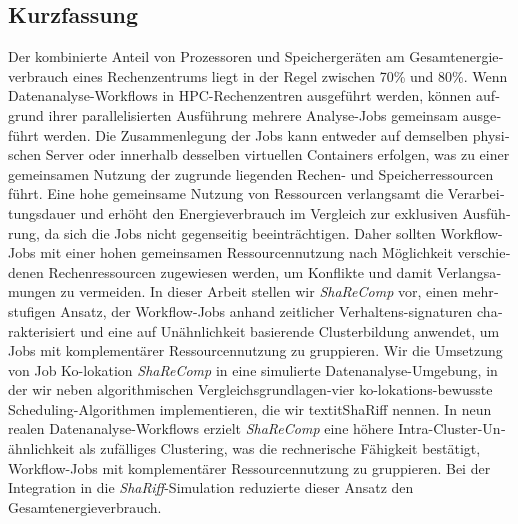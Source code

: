 \documentclass[a4paper, 11pt]{article}
\begin{document}
\clearpage
\begin{otherlanguage}{ngerman}
    \section*{Kurzfassung}
    Der kombinierte Anteil von Prozessoren und Speichergeräten am Gesamtenergieverbrauch eines Rechenzentrums liegt in der Regel zwischen 70\% und 80\%. Wenn Datenanalyse-Workflows in HPC-Rechenzentren ausgeführt werden, können aufgrund ihrer parallelisierten Ausführung mehrere Analyse-Jobs gemeinsam ausgeführt werden. Die Zusammenlegung der Jobs kann entweder auf demselben physischen Server oder innerhalb desselben virtuellen Containers erfolgen, was zu einer gemeinsamen Nutzung der zugrunde liegenden Rechen- und Speicherressourcen führt. Eine hohe gemeinsame Nutzung von Ressourcen verlangsamt die Verarbeitungsdauer und erhöht den Energieverbrauch im Vergleich zur exklusiven Ausführung, da sich die Jobs nicht gegenseitig beeinträchtigen. Daher sollten Workflow-Jobs mit einer hohen gemeinsamen Ressourcennutzung nach Möglichkeit verschiedenen Rechenressourcen zugewiesen werden, um Konflikte und damit Verlangsamungen zu vermeiden. In dieser Arbeit stellen wir \textit{ShaReComp} vor, einen mehrstufigen Ansatz, der Workflow-Jobs anhand zeitlicher Verhaltens-signaturen charakterisiert und eine auf Unähnlichkeit basierende Clusterbildung anwendet, um Jobs mit komplementärer Ressourcennutzung zu gruppieren. Wir die Umsetzung von Job Ko-lokation \textit{ShaReComp} in eine simulierte Datenanalyse-Umgebung, in der wir neben algorithmischen Vergleichsgrundlagen-vier ko-lokations-bewusste Scheduling-Algorithmen implementieren, die wir  textit{ShaRiff} nennen. In neun realen Datenanalyse-Workflows erzielt \textit{ShaReComp} eine höhere Intra-Cluster-Unähnlichkeit als zufälliges Clustering, was die rechnerische Fähigkeit bestätigt, Workflow-Jobs mit komplementärer Ressourcennutzung zu gruppieren. Bei der Integration in die \textit{ShaRiff}-Simulation reduzierte dieser Ansatz den Gesamtenergieverbrauch.
\end{otherlanguage}

\clearpage

\tableofcontents
\listoftables
\listoffigures
\listofalgorithms
\clearpage


\clearpage

\clearpage

\clearpage

\clearpage

\clearpage

\clearpage


\clearpage


\clearpage



\newpage
\printbibliography[heading=bibintoc,title={Bibliography}]
\end{document}
